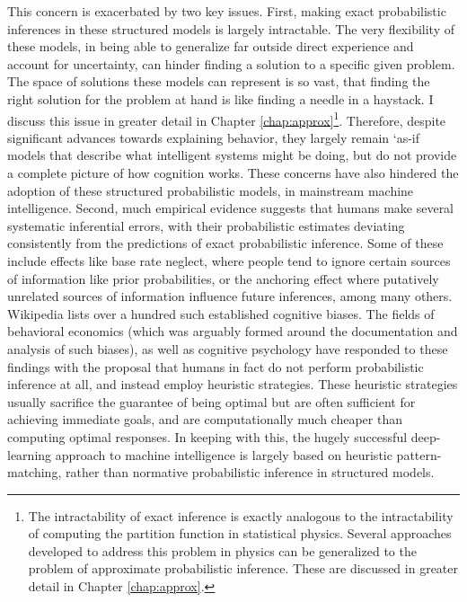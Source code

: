 This concern is exacerbated by two key issues. First, making exact probabilistic inferences in these structured models is largely intractable. The very flexibility of these models, in being able to generalize far outside direct experience and account for uncertainty, can hinder finding a solution to a specific given problem. The space of solutions these models can represent is so vast, that finding the right solution for the problem at hand is like finding a needle in a haystack. I discuss this issue in greater detail in Chapter \ref{chap:approx}\footnote{The intractability of exact inference is exactly analogous to the intractability of computing the partition function in statistical physics. Several approaches developed to address this problem in physics can be generalized to the problem of approximate probabilistic inference. These are discussed in greater detail in Chapter \ref{chap:approx}.}. Therefore, despite significant advances towards explaining behavior, they largely remain `as-if models that describe what intelligent systems might be doing, but do not provide a complete picture of how cognition works. These concerns have also hindered the adoption of these structured probabilistic models, in mainstream machine intelligence. Second, much empirical evidence suggests that humans make several systematic inferential errors, with their probabilistic estimates deviating consistently from the predictions of exact probabilistic inference. Some of these include effects like base rate neglect\citep{koehler1996base}, where people tend to ignore certain sources of information like prior probabilities, or the anchoring effect\citep{tversky} where putatively unrelated sources of information influence future inferences, among many others. Wikipedia lists over a hundred such established cognitive biases. The fields of behavioral economics\citep{kahneman1973psychology} (which was arguably formed around the documentation and analysis of such biases), as well as cognitive psychology\citep{phillips1966conservatism, gigerenzer1996reasoning} have responded to these findings with the proposal that humans in fact do not perform probabilistic inference at all, and instead employ heuristic strategies. These heuristic strategies usually sacrifice the guarantee of being optimal but are often sufficient for achieving immediate goals, and are computationally much cheaper than computing optimal responses. In keeping with this, the hugely successful deep-learning approach to machine intelligence is largely based on heuristic pattern-matching\citep{marcus2018deep, lake18}, rather than normative probabilistic inference in structured models. 

